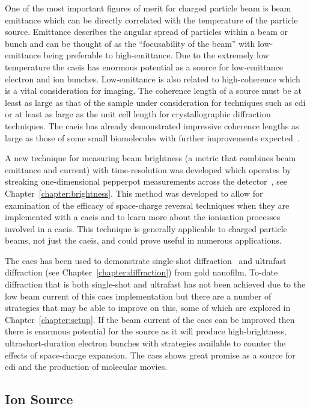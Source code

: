 One of the most important figures of merit for charged particle beam is beam emittance which can be directly correlated with the temperature of the particle source.
Emittance describes the angular spread of particles within a beam or bunch and can be thought of as the ``focusability of the beam'' with low-emittance being preferable to high-emittance.
Due to the extremely low temperature the \gls{caeis} has enormous potential as a source for low-emittance electron and ion bunches.
Low-emittance is also related to high-coherence which is a vital consideration for imaging.
The coherence length of a source must be at least as large as that of the sample under consideration for techniques such as \gls{cdi} or at least as large as the unit cell length for crystallographic diffraction techniques.
The \gls{caeis} has already demonstrated impressive coherence lengths as large as those of some small biomolecules with further improvements expected~\cite{saliba_spatial_2012}.

A new technique for measuring beam brightness (a metric that combines beam emittance and current) with time-resolution was developed which operates by streaking one-dimensional pepperpot measurements across the detector~\cite{torrance_time-resolved_2018}, see Chapter~\ref{chapter:brightness}.
This method was developed to allow for examination of the efficacy of space-charge reversal techniques when they are implemented with a \gls{caeis} and to learn more about the ionisation processes involved in a \gls{caeis}.
This technique is generally applicable to charged particle beams, not just the \gls{caeis}, and could prove useful in numerous applications.

The \gls{caes} has been used to demonstrate single-shot diffraction~\cite{speirs_single-shot_2015} and ultrafast diffraction (see Chapter~\ref{chapter:diffraction}) from gold nanofilm.
To-date diffraction that is both single-shot and ultrafast has not been achieved due to the low beam current of this \gls{caes} implementation but there are a number of strategies that may be able to improve on this, some of which are explored in Chapter~\ref{chapter:setup}.
If the beam current of the \gls{caes} can be improved then there is enormous potential for the source as it will produce high-brightness, ultrashort-duration electron bunches with strategies available to counter the effects of space-charge expansion.
The \gls{caes} shows great promise as a source for \gls{cdi} and the production of molecular movies.

\subsection{Ion Source}

